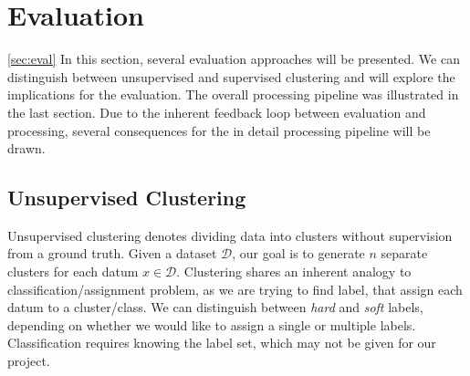 \newpage %
\section{Evaluation}
\ref{sec:eval}
In this section, several evaluation approaches will be presented. We can distinguish between unsupervised and supervised clustering and will explore the implications for the evaluation. The overall processing pipeline was illustrated in the last section. Due to the inherent feedback loop between evaluation and processing, several consequences for the in detail processing pipeline will be drawn.


\subsection{Unsupervised Clustering}
Unsupervised clustering denotes dividing data into clusters without supervision from a ground truth. Given a dataset $ \mathcal{D} $, our goal is to generate $ n $ separate clusters for each datum $ x \in \mathcal{D} $. Clustering shares an inherent analogy to classification/assignment problem, as we are trying to find label, that assign each datum to a cluster/class. We can distinguish between \textit{hard} and \textit{soft} labels, depending on whether we would like to assign a single or multiple labels. Classification requires knowing the label set, which may not be given for our project.




